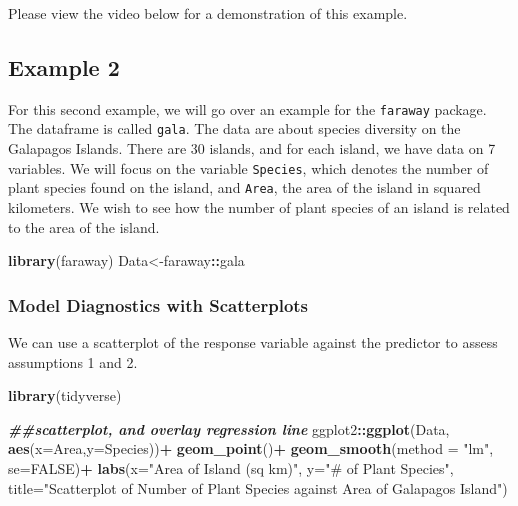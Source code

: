 \documentclass[
]{book}
\newenvironment{Shaded}{\begin{snugshade}}{\end{snugshade}}
\newcommand{\AttributeTok}[1]{\textcolor[rgb]{0.13,0.29,0.53}{#1}}
\newcommand{\ConstantTok}[1]{\textcolor[rgb]{0.56,0.35,0.01}{#1}}
\newcommand{\DocumentationTok}[1]{\textcolor[rgb]{0.56,0.35,0.01}{\textbf{\textit{#1}}}}
\newcommand{\FunctionTok}[1]{\textcolor[rgb]{0.13,0.29,0.53}{\textbf{#1}}}
\newcommand{\NormalTok}[1]{#1}
\newcommand{\OtherTok}[1]{\textcolor[rgb]{0.56,0.35,0.01}{#1}}
\newcommand{\SpecialCharTok}[1]{\textcolor[rgb]{0.81,0.36,0.00}{\textbf{#1}}}
\newcommand{\StringTok}[1]{\textcolor[rgb]{0.31,0.60,0.02}{#1}}
\begin{document}
Please view the video below for a demonstration of this example.

\hypertarget{example-2}{%
\subsection{Example 2}\label{example-2}}

For this second example, we will go over an example for the \texttt{faraway} package. The dataframe is called \texttt{gala}. The data are about species diversity on the Galapagos Islands. There are 30 islands, and for each island, we have data on 7 variables. We will focus on the variable \texttt{Species}, which denotes the number of plant species found on the island, and \texttt{Area}, the area of the island in squared kilometers. We wish to see how the number of plant species of an island is related to the area of the island.

\begin{Shaded}
\begin{Highlighting}[]
\FunctionTok{library}\NormalTok{(faraway)}
\NormalTok{Data}\OtherTok{\textless{}{-}}\NormalTok{faraway}\SpecialCharTok{::}\NormalTok{gala}
\end{Highlighting}
\end{Shaded}

\hypertarget{model-diagnostics-with-scatterplots-1}{%
\subsubsection*{Model Diagnostics with Scatterplots}\label{model-diagnostics-with-scatterplots-1}}

We can use a scatterplot of the response variable against the predictor to assess assumptions 1 and 2.

\begin{Shaded}
\begin{Highlighting}[]
\FunctionTok{library}\NormalTok{(tidyverse)}

\DocumentationTok{\#\#scatterplot, and overlay regression line}
\NormalTok{ggplot2}\SpecialCharTok{::}\FunctionTok{ggplot}\NormalTok{(Data, }\FunctionTok{aes}\NormalTok{(}\AttributeTok{x=}\NormalTok{Area,}\AttributeTok{y=}\NormalTok{Species))}\SpecialCharTok{+}
  \FunctionTok{geom\_point}\NormalTok{()}\SpecialCharTok{+}
  \FunctionTok{geom\_smooth}\NormalTok{(}\AttributeTok{method =} \StringTok{"lm"}\NormalTok{, }\AttributeTok{se=}\ConstantTok{FALSE}\NormalTok{)}\SpecialCharTok{+}
  \FunctionTok{labs}\NormalTok{(}\AttributeTok{x=}\StringTok{"Area of Island (sq km)"}\NormalTok{, }\AttributeTok{y=}\StringTok{"\# of Plant Species"}\NormalTok{, }
       \AttributeTok{title=}\StringTok{"Scatterplot of Number of Plant Species against Area of Galapagos Island"}\NormalTok{)}
\end{Highlighting}
\end{Shaded}
\end{document}
